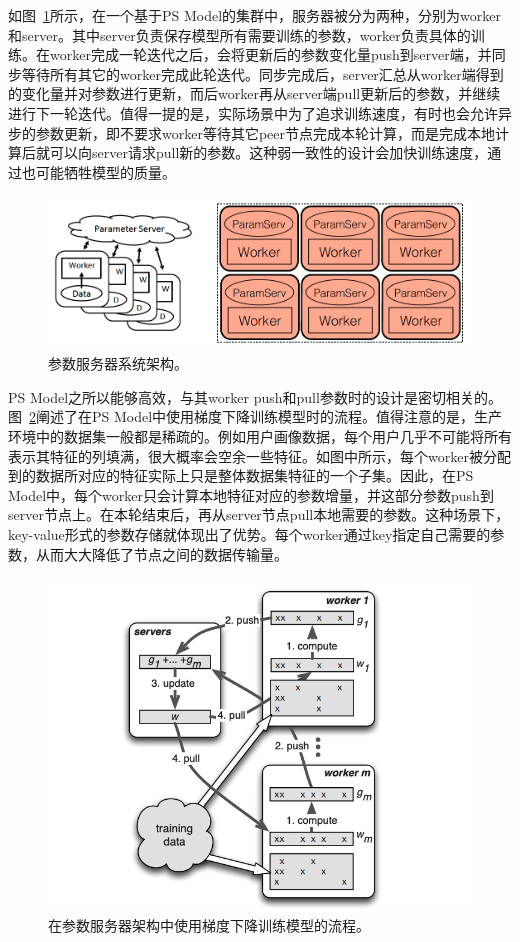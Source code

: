 如图~\ref{ps_arch}所示，在一个基于PS Model的集群中，服务器被分为两种，分别为worker和server。其中server负责保存模型所有需要训练的参数，worker负责具体的训练。在worker完成一轮迭代之后，会将更新后的参数变化量push到server端，并同步等待所有其它的worker完成此轮迭代。同步完成后，server汇总从worker端得到的变化量并对参数进行更新，而后worker再从server端pull更新后的参数，并继续进行下一轮迭代。值得一提的是，实际场景中为了追求训练速度，有时也会允许异步的参数更新，即不要求worker等待其它peer节点完成本轮计算，而是完成本地计算后就可以向server请求pull新的参数。这种弱一致性的设计会加快训练速度，通过也可能牺牲模型的质量。

\begin{figure}[h]
    \centerline{\includegraphics[width=\textwidth]{figures/ps-arch.png}}
    \caption{参数服务器系统架构。}
    \label{ps_arch}
\end{figure}

PS Model之所以能够高效，与其worker push和pull参数时的设计是密切相关的。 图~\ref{ps_sgd}阐述了在PS Model中使用梯度下降训练模型时的流程。值得注意的是，生产环境中的数据集一般都是稀疏的。例如用户画像数据，每个用户几乎不可能将所有表示其特征的列填满，很大概率会空余一些特征。如图中所示，每个worker被分配到的数据所对应的特征实际上只是整体数据集特征的一个子集。因此，在PS Model中，每个worker只会计算本地特征对应的参数增量，并这部分参数push到server节点上。在本轮结束后，再从server节点pull本地需要的参数。这种场景下，key-value形式的参数存储就体现出了优势。每个worker通过key指定自己需要的参数，从而大大降低了节点之间的数据传输量。

\begin{figure}[h]
    \centerline{\includegraphics[width=\textwidth]{figures/ps-sgd.png}}
    \caption{在参数服务器架构中使用梯度下降训练模型的流程。}
    \label{ps_sgd}
\end{figure}

